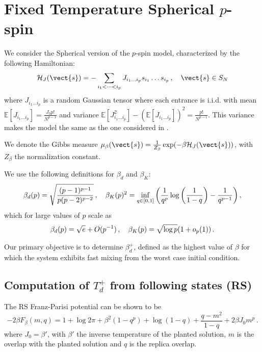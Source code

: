 \documentclass[superscriptaddress,amsmath, amssymb, onecolumn, pra]{revtex4-2}
\begin{document}
\tableofcontents

\section{Fixed Temperature Spherical $p$-spin}
We consider the Spherical version of the $p$-spin model, characterized by the following Hamiltonian:
\begin{equation}\label{eq:H_pspin_spherical}
    \mathcal{H}_J(\vect{s}) = -\sum_{i_1<\dots<i_p}J_{i_1\dots i_p}s_{i_1}\dots s_{i_p}\,,\quad \vect{s}\in S_N
\end{equation}
where $J_{i_1\dots i_p}$ is a random Gaussian tensor where each entrance is i.i.d. with mean $\mathbb{E}[J_{i_1\dots i_p}]=\frac{J_0 p!}{N^{p-1}}$ and variance $\mathbb{E}[J^2_{i_1\dots i_p}] - \left(\mathbb{E}[J_{i_1\dots i_p}]\right)^2=\frac{p!}{N^{p-1}}$.
This variance makes the model the same as the one considered in \cite{alaoui_shattering_2024}.

We denote the Gibbs measure $\mu_{\beta}(\vect{s}) = \frac{1}{Z_{\beta}}\exp(-\beta\mathcal{H}_J(\vect{s})) $, with $Z_{\beta}$ the normalization constant.

We use the following definitions for $\beta_d$ and $\beta_K$:
\begin{equation}
    \beta_d(p) = \sqrt{\frac{(p-1)^{p-1}}{p (p-2)^{p-2}}}\,,\quad 
    \beta_K(p)^2 = \inf_{q \in [0,1]} \qty(\frac{1}{q^p} \log\qty(\frac{1}{1-q}) - \frac{1}{q^{p-1}}) \,,
\end{equation}
which for large values of $p$ scale as
\begin{equation}\label{eq:betad-betac-defs}
    \beta_d(p) = \sqrt{e} + O(p^{-1}) \,, \quad \beta_K(p) = \sqrt{\log p} \qty(1 + o_p(1)) \,.
\end{equation}

Our primary objective is to determine $\beta_d^+$, defined as the highest value of $\beta$ for which the system exhibits fast mixing from the worst case initial condition.
\subsection{Computation of $T_d^+$ from following states (RS)}
The RS Franz-Parisi potential can be shown to be
\begin{equation}\label{eq:FP_RS_spherical}
    -2\beta F_\beta(m,q) = 1 + \log 2\pi + \beta^2(1-q^p) + \log(1-q) + \frac{q-m^2}{1-q} + 2\beta J_0 m^p\,.
\end{equation}
where $J_0 = \beta' $, with $\beta'$ the inverse temperature of the planted solution, $m$ is the overlap with the planted solution and $q$ is the replica overlap.
\end{document}

